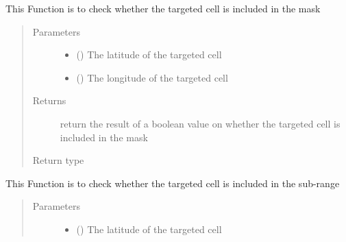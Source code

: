 \documentclass[letterpaper,10pt,english]{sphinxmanual}
\begin{document}
\begin{fulllineitems}
\begin{fulllineitems}
\label{\detokenize{AgentTools.GenericModelAgent:AgentTools.GenericModelAgent.ForcingDataFileGenerator.ForcingDataFileGenerator.check_mask}}
This Function is to check whether the targeted cell is included in the mask
\begin{quote}\begin{description}
\item[{Parameters}] \leavevmode\begin{itemize}
\item {} 
 () \textendash{} The latitude of the targeted cell

\item {} 
 () \textendash{} The longitude of the targeted cell

\end{itemize}

\item[{Returns}] \leavevmode
return the result of a boolean value on whether the targeted cell is included in the mask

\item[{Return type}] \leavevmode
{}

\end{description}\end{quote}

\end{fulllineitems}


\begin{fulllineitems}
\label{\detokenize{AgentTools.GenericModelAgent:AgentTools.GenericModelAgent.ForcingDataFileGenerator.ForcingDataFileGenerator.check_subrange}}
This Function is to check whether the targeted cell is included in the sub-range
\begin{quote}\begin{description}
\item[{Parameters}] \leavevmode\begin{itemize}
\item {} 
 () \textendash{} The latitude of the targeted cell


\end{itemize}
\end{description}
\end{quote}
\end{fulllineitems}
\end{fulllineitems}
\end{document}
